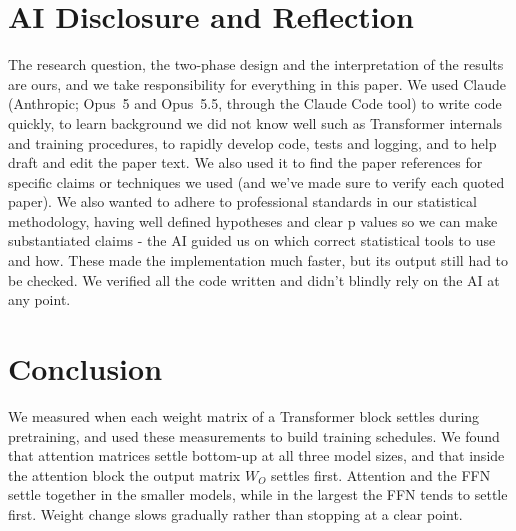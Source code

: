 \documentclass[11pt]{article}
\newcommand{\Wo}{W_O}
\begin{document}
\begin{itemize}
\end{itemize}

\section{AI Disclosure and Reflection}

The research question, the two-phase design and the interpretation of the
results are ours, and we take responsibility for everything in this paper.
We used Claude (Anthropic; Opus~5 and Opus~5.5, through the Claude Code tool)
to write code quickly, to learn background we did not know well such as
Transformer internals and training procedures, to rapidly develop code, tests and logging, and to help draft and edit the paper text. We also used it to find the paper references for specific claims or techniques we used (and we've made sure to verify each quoted paper). We also wanted to adhere to professional standards in our statistical methodology, having well defined hypotheses and clear p values so we can make substantiated claims - the AI guided us on which correct statistical tools to use and how.
These made the implementation much faster, but its output still had to be checked. We verified all the code written and didn't blindly rely on the AI at any point.


\section{Conclusion}

We measured when each weight matrix of a Transformer block settles during
pretraining, and used these measurements to build training schedules. We found
that attention matrices settle bottom-up at all three model sizes, and that
inside the attention block the output matrix $\Wo$ settles first. Attention
and the FFN settle together in the smaller models, while in the largest the
FFN tends to settle first. Weight change slows gradually rather than stopping
at a clear point.
\end{document}
